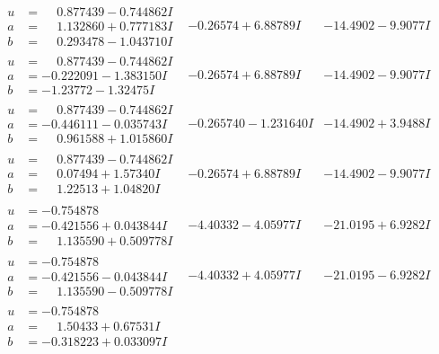 \documentclass[1p]{elsarticle_modified}
\theoremstyle{definition}
\begin{document}
$$\begin{array}{c|c|c}
\begin{aligned}
u &= \phantom{-}0.877439 - 0.744862 I \\
a &= \phantom{-}1.132860 + 0.777183 I \\
b &= \phantom{-}0.293478 - 1.043710 I\end{aligned}
 & -0.26574 + 6.88789 I & -14.4902 - 9.9077 I \\ \hline\begin{aligned}
u &= \phantom{-}0.877439 - 0.744862 I \\
a &= -0.222091 - 1.383150 I \\
b &= -1.23772 - 1.32475 I\end{aligned}
 & -0.26574 + 6.88789 I & -14.4902 - 9.9077 I \\ \hline\begin{aligned}
u &= \phantom{-}0.877439 - 0.744862 I \\
a &= -0.446111 - 0.035743 I \\
b &= \phantom{-}0.961588 + 1.015860 I\end{aligned}
 & -0.265740 - 1.231640 I & -14.4902 + 3.9488 I \\ \hline\begin{aligned}
u &= \phantom{-}0.877439 - 0.744862 I \\
a &= \phantom{-}0.07494 + 1.57340 I \\
b &= \phantom{-}1.22513 + 1.04820 I\end{aligned}
 & -0.26574 + 6.88789 I & -14.4902 - 9.9077 I \\ \hline\begin{aligned}
u &= -0.754878\phantom{ +0.000000I} \\
a &= -0.421556 + 0.043844 I \\
b &= \phantom{-}1.135590 + 0.509778 I\end{aligned}
 & -4.40332 - 4.05977 I & -21.0195 + 6.9282 I \\ \hline\begin{aligned}
u &= -0.754878\phantom{ +0.000000I} \\
a &= -0.421556 - 0.043844 I \\
b &= \phantom{-}1.135590 - 0.509778 I\end{aligned}
 & -4.40332 + 4.05977 I & -21.0195 - 6.9282 I \\ \hline\begin{aligned}
u &= -0.754878\phantom{ +0.000000I} \\
a &= \phantom{-}1.50433 + 0.67531 I \\
b &= -0.318223 + 0.033097 I\end{aligned}

\end{array}$$
\end{document}
